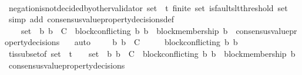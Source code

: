 \begin{isabellebody}
\ \ \ \ \ \ \isamarkupfalse%
\ negation{\isacharunderscore}is{\isacharunderscore}not{\isacharunderscore}decided{\isacharunderscore}by{\isacharunderscore}other{\isacharunderscore}validator\ {\isacartoucheopen}{\isasymsigma}{\isacharunderscore}set\ {\isasymsubseteq}\ {\isasymSigma}t{\isacartoucheclose}\ {\isacartoucheopen}finite\ {\isasymsigma}{\isacharunderscore}set{\isacartoucheclose}\ {\isacartoucheopen}is{\isacharunderscore}faults{\isacharunderscore}lt{\isacharunderscore}threshold\ {\isacharparenleft}{\isasymUnion}{\isasymsigma}{\isacharunderscore}set{\isacharparenright}{\isacartoucheclose}\ \isamarkupfalse%
\ {\isacharparenleft}simp\ add{\isacharcolon}\ consensus{\isacharunderscore}value{\isacharunderscore}property{\isacharunderscore}decisions{\isacharunderscore}def{\isacharparenright}\ \isanewline
\ \ \ \ \ \ \isamarkupfalse%
\ {\isacartoucheopen}{\isacharbraceleft}{\isasymsigma}{\isacharcomma}\ {\isasymsigma}{\isacharprime}{\isacharbraceright}\ {\isasymsubseteq}\ {\isasymsigma}{\isacharunderscore}set\ {\isasymand}\ {\isacharbraceleft}b{}{\isacharcomma}\ b{}{\isacharbraceright}\ {\isasymsubseteq}\ C\ {\isasymand}\ block{\isacharunderscore}conflicting\ {\isacharparenleft}b{}{\isacharcomma}\ b{}{\isacharparenright}\ {\isasymand}\ block{\isacharunderscore}membership\ b{}\ {\isasymin}\ consensus{\isacharunderscore}value{\isacharunderscore}property{\isacharunderscore}decisions\ {\isasymsigma}{\isacartoucheclose}\ \isamarkupfalse%
\ auto\isanewline
\ \ \ \isamarkupfalse%
\ {\isachardoublequoteopen}{\isacharbraceleft}b{}{\isacharcomma}\ b{}{\isacharbraceright}\ {\isasymsubseteq}\ C\ {\isasymand}\ {\isasymsigma}\ {\isasymin}\ {\isasymSigma}\ {\isasymand}\ block{\isacharunderscore}conflicting\ {\isacharparenleft}b{}{\isacharcomma}\ b{}{\isacharparenright}{\isachardoublequoteclose}\isanewline
\ \ \ \ \ \isamarkupfalse%
\ {\isasymSigma}t{\isacharunderscore}is{\isacharunderscore}subset{\isacharunderscore}of{\isacharunderscore}{\isasymSigma}\ {\isacartoucheopen}{\isasymsigma}{\isacharunderscore}set\ {\isasymsubseteq}\ {\isasymSigma}t{\isacartoucheclose}\ {\isacartoucheopen}{\isacharbraceleft}{\isasymsigma}{\isacharcomma}\ {\isasymsigma}{\isacharprime}{\isacharbraceright}\ {\isasymsubseteq}\ {\isasymsigma}{\isacharunderscore}set\ {\isasymand}\ {\isacharbraceleft}b{}{\isacharcomma}\ b{}{\isacharbraceright}\ {\isasymsubseteq}\ C\ {\isasymand}\ block{\isacharunderscore}conflicting\ {\isacharparenleft}b{}{\isacharcomma}\ b{}{\isacharparenright}\ {\isasymand}\ block{\isacharunderscore}membership\ b{}\ {\isasymin}\ consensus{\isacharunderscore}value{\isacharunderscore}property{\isacharunderscore}decisions\ {\isasymsigma}{\isacartoucheclose}\ \isamarkupfalse%

\end{isabellebody}
